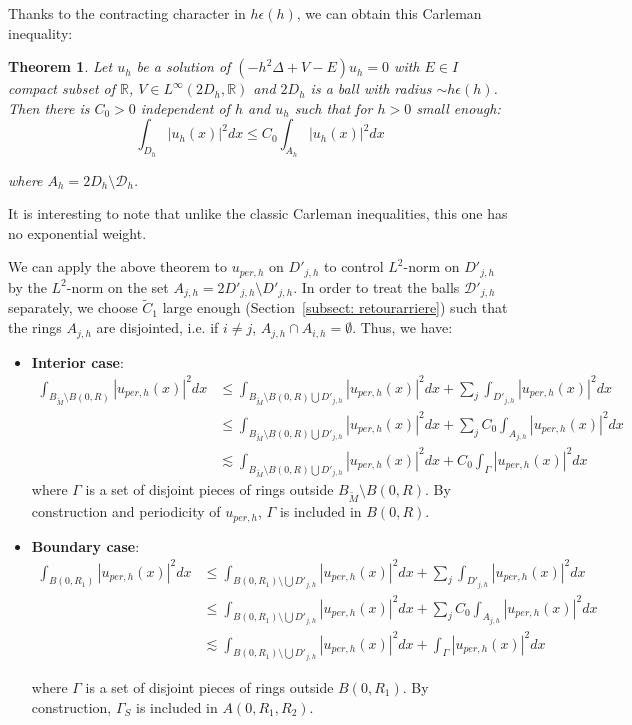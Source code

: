 \documentclass[leqno,11pt,letterpaper, english]{amsart}
\newcommand{\D}{{\mathcal D}}
\newcommand{\nn}{\nonumber}
\theoremstyle{plain}
\newtheorem{thm}{Theorem}
\theoremstyle{definition}
\numberwithin{equation}{section}
\def\R{\mathbb R}
\begin{document}
Thanks to the contracting character in $h\epsilon(h)$, we can obtain this Carleman inequality:

\begin{thm}
\label{thm: Carlm contractant}
Let $u_h$ be a solution of $(-h^2\Delta + V - E)u_h = 0$ with $E \in I$ compact subset of $\mathbb{R}$, $V \in L^\infty(2D_h,\R)$ and $2D_h$ is a ball with radius $\sim h\epsilon(h)$. Then there is $C_0 > 0$ independent of $h$ and $u_h$ such that for $h > 0$ small enough:
			\begin{equation}
				\int_{D_{h}} |u_h(x)|^2dx \leq C_0 \int_{A_{h}} |u_h(x)|^2dx 
			\end{equation}

where $A_{h} = 2D_{h} \setminus \D_{h}$.
\end{thm}
It is interesting to note that unlike the classic Carleman inequalities, this one has no exponential weight.

We can apply the above theorem to $u_{per,h}$ on $D'_{j,h}$ to control $L^2$-norm on $D'_{j,h}$ by the $L^2$-norm on the set $A_{j,h}=2D'_{j,h}\setminus D'_{j,h}$. In order to treat the balls $\D'_{j,h}$ separately, we choose $\tilde{C}_1$ large enough (Section~\ref{subsect: retourarriere}) such that the rings $A_{j,h}$ are disjointed, i.e. if $i \neq j$, $A_{j,h} \cap A_{i,h} = \emptyset$. Thus, we have:
\begin{itemize}
    \item \textbf{Interior case}:
		\begin{align}
			\int_{B_{\tilde{M}}\setminus B(0,R)} | u_{per,h}(x)|^2 dx &\leq  \int_{B_{\tilde{M}}\setminus B(0,R)\bigcup D'_{j,h}} | u_{per,h}(x)|^2 dx + \sum_{j}\int_{D'_{j,h}} | u_{per,h}(x)|^2 dx\nn\\
			&\leq \int_{B_{\tilde{M}}\setminus B(0,R)\bigcup D'_{j,h}} | u_{per,h}(x)|^2 dx + \sum_{j}C_0 \int_{A_{j,h}}  |u_{per,h}(x)|^2 dx\nn\\
			&\lesssim  \int_{B_{ \tilde{M}}\setminus B(0,R)\bigcup D'_{j,h}} | u_{per,h}(x)|^2 dx + C_0 \int_{\Gamma}  |u_{per,h}(x)|^2 dx
		\end{align}
    where $\Gamma$ is a set of disjoint pieces of rings outside $B_{\tilde{M}} \setminus B(0, R)$. By construction and periodicity of $u_{per,h}$, $\Gamma$ is included in $B(0, R)$.
%
    \item \textbf{Boundary case}:
%
		\begin{align}
			\int_{B(0,R_1)} | u_{per,h}(x)|^2 dx &\leq  \int_{B(0,R_1)\setminus \bigcup D'_{j,h}} | u_{per,h}(x)|^2 dx + \sum_{j}\int_{D'_{j,h}} | u_{per,h}(x)|^2 dx\nn\\
			&\leq \int_{B(0,R_1)\setminus \bigcup D'_{j,h}} | u_{per,h}(x)|^2 dx + \sum_{j}C_0 \int_{A_{j,h}}  |u_{per,h}(x)|^2 dx\nn\\
			&\lesssim  \int_{B(0,R_1)\setminus \bigcup D'_{j,h}} | u_{per,h}(x)|^2 dx +  \int_{\Gamma}  |u_{per,h}(x)|^2 dx
		\end{align}

   where $\Gamma$ is a set of disjoint pieces of rings outside $B(0, R_1)$. By construction, $\Gamma_S$ is included in $A(0, R_1, R_2)$.
\end{itemize}
\end{document}
